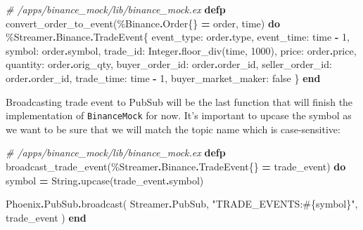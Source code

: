 \documentclass[
]{book}
\newenvironment{Shaded}{\begin{snugshade}}{\end{snugshade}}
\newcommand{\CommentTok}[1]{\textcolor[rgb]{0.56,0.35,0.01}{\textit{#1}}}
\newcommand{\ConstantTok}[1]{\textcolor[rgb]{0.00,0.00,0.00}{#1}}
\newcommand{\DecValTok}[1]{\textcolor[rgb]{0.00,0.00,0.81}{#1}}
\newcommand{\KeywordTok}[1]{\textcolor[rgb]{0.13,0.29,0.53}{\textbf{#1}}}
\newcommand{\NormalTok}[1]{#1}
\newcommand{\OperatorTok}[1]{\textcolor[rgb]{0.81,0.36,0.00}{\textbf{#1}}}
\newcommand{\OtherTok}[1]{\textcolor[rgb]{0.56,0.35,0.01}{#1}}
\newcommand{\StringTok}[1]{\textcolor[rgb]{0.31,0.60,0.02}{#1}}
\newcommand{\VariableTok}[1]{\textcolor[rgb]{0.00,0.00,0.00}{#1}}
\begin{document}
\begin{Shaded}
\begin{Highlighting}[]
\CommentTok{\# /apps/binance\_mock/lib/binance\_mock.ex}
  \KeywordTok{defp}\NormalTok{ convert\_order\_to\_event(\%}\ConstantTok{Binance}\OperatorTok{.}\ConstantTok{Order}\NormalTok{\{\} }\OperatorTok{=}\NormalTok{ order, time) }\KeywordTok{do}
\NormalTok{    \%}\ConstantTok{Streamer}\OperatorTok{.}\ConstantTok{Binance}\OperatorTok{.}\ConstantTok{TradeEvent}\NormalTok{\{}
      \VariableTok{event\_type:}\NormalTok{ order}\OperatorTok{.}\NormalTok{type,}
      \VariableTok{event\_time:}\NormalTok{ time }\OperatorTok{{-}} \DecValTok{1}\NormalTok{,}
      \VariableTok{symbol:}\NormalTok{ order}\OperatorTok{.}\NormalTok{symbol,}
      \VariableTok{trade\_id:} \ConstantTok{Integer}\OperatorTok{.}\NormalTok{floor\_div(time, }\DecValTok{1000}\NormalTok{),}
      \VariableTok{price:}\NormalTok{ order}\OperatorTok{.}\NormalTok{price,}
      \VariableTok{quantity:}\NormalTok{ order}\OperatorTok{.}\NormalTok{orig\_qty,}
      \VariableTok{buyer\_order\_id:}\NormalTok{ order}\OperatorTok{.}\NormalTok{order\_id,}
      \VariableTok{seller\_order\_id:}\NormalTok{ order}\OperatorTok{.}\NormalTok{order\_id,}
      \VariableTok{trade\_time:}\NormalTok{ time }\OperatorTok{{-}} \DecValTok{1}\NormalTok{,}
      \VariableTok{buyer\_market\_maker:} \ConstantTok{false}
\NormalTok{    \}}
  \KeywordTok{end}
\end{Highlighting}
\end{Shaded}

Broadcasting trade event to PubSub will be the last function that will finish
the implementation of \texttt{BinanceMock} for now. It's important to upcase the symbol as we want to be sure that we will match the topic name which is case-sensitive:

\begin{Shaded}
\begin{Highlighting}[]
\CommentTok{\# /apps/binance\_mock/lib/binance\_mock.ex}
  \KeywordTok{defp}\NormalTok{ broadcast\_trade\_event(\%}\ConstantTok{Streamer}\OperatorTok{.}\ConstantTok{Binance}\OperatorTok{.}\ConstantTok{TradeEvent}\NormalTok{\{\} }\OperatorTok{=}\NormalTok{ trade\_event) }\KeywordTok{do}
\NormalTok{    symbol }\OperatorTok{=} \ConstantTok{String}\OperatorTok{.}\NormalTok{upcase(trade\_event}\OperatorTok{.}\NormalTok{symbol)}

    \ConstantTok{Phoenix}\OperatorTok{.}\ConstantTok{PubSub}\OperatorTok{.}\NormalTok{broadcast(}
      \ConstantTok{Streamer}\OperatorTok{.}\ConstantTok{PubSub}\NormalTok{,}
      \StringTok{"TRADE\_EVENTS:}\OtherTok{\#\{}\NormalTok{symbol}\OtherTok{\}}\StringTok{"}\NormalTok{,}
\NormalTok{      trade\_event}
\NormalTok{    )}
  \KeywordTok{end}
\end{Highlighting}
\end{Shaded}
\end{document}
